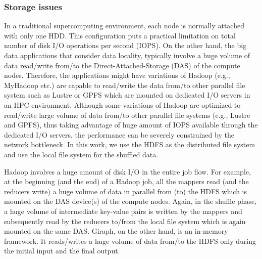 \documentclass[conference]{IEEEtran}
\begin{document}
\subsubsection {Storage issues}
In a traditional supercomputing environment, each node is normally attached with only one HDD. 
This configuration puts a practical limitation on total number of disk I/O operations per second (IOPS). On the other hand, the big data applications that consider data locality, typically involve a huge volume of data read/write from/to the Direct-Attached-Storage (DAS) of the compute nodes. Therefore, the applications might have variations of Hadoop (e.g., MyHadoop etc.) are capable to read/write the data from/to other parallel file system such as Lustre or GPFS which are mounted on dedicated I/O servers in an HPC environment. 
Although some variations of Hadoop are optimized to read/write large volume of data from/to other parallel file systems (e.g., Lustre and GPFS), thus taking advantage of huge amount of IOPS available through the dedicated I/O servers, the performance can be severely constrained by the network bottleneck. %
In this work, we use the HDFS as the distributed file system and use the local file system for the shuffled data.

Hadoop involves a huge amount of disk I/O in the entire job flow. 
For example, at the beginning (and the end) of a Hadoop job, all the mappers read (and the reducers write) a huge volume of data in parallel from (to) the HDFS which is mounted on the DAS device(s) of the compute nodes.
Again, in the shuffle phase, a huge volume of intermediate key-value pairs is written by the mappers and subsequently read by the reducers to/from the local file system which is again mounted on the same DAS.
Giraph, on the other hand, is an in-memory framework. It reads/writes a huge volume of data from/to the HDFS only during the initial input and the final output. 
\end{document}
